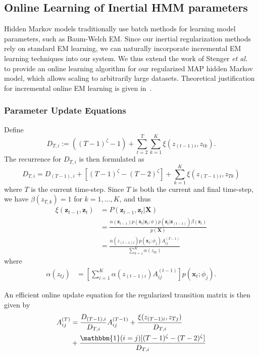 \documentclass[letterpaper]{article}
\begin{document}
\subsection{Online Learning of Inertial HMM parameters}

Hidden Markov models traditionally use batch methods for learning model
parameters, such as Baum-Welch EM. Since our inertial regularization methods
rely on standard EM learning, we can naturally incorporate incremental EM
learning techniques into our system. We thus extend the work of Stenger \emph{et
al.}~\cite{stenger2001} to provide an online learning algorithm for our
regularized MAP hidden Markov model, which allows scaling to arbitrarily large
datasets. Theoretical justification for incremental online EM learning is given
in~\cite{Neal:1999:VEA:308574.308679}.

\subsubsection{Parameter Update Equations}

Define 
\[
   D_{T,i} := ((T-1)^\zeta -1) + \sum_{t=2}^{T}\sum_{k=1}^{K} \xi(z_{(t-1)i}, z_{tk}).
\]
The recurrence for $D_{T,i}$ is then formulated as
\begin{equation*}
    D_{T,i} = D_{(T-1), i} + [(T-1)^\zeta - (T-2)^\zeta] + \sum_{k=1}^{K}
    \xi(z_{(T-1)i}, z_{Tk})
\end{equation*}
where $T$ is the current time-step. Since $T$ is both the current and final time-step, we have $\beta(z_{T,k}) = 1$ for $k = 1, \ldots, K$, and thus
\begin{align*}
    \xi(\mathbf{z}_{t-1}, \mathbf{z}_{t}) 
            &= P(\mathbf{z}_{t-1}, \mathbf{z}_{t} | \mathbf{X}) \\
            &= \frac{\alpha(\mathbf{z}_{t-1})p(\mathbf{x}_t|\mathbf{z}_t; \phi)p(\mathbf{z}_{t}|\mathbf{z}_{(t-1)})\beta(\mathbf{z}_t)}{p(\mathbf{X})} \\
            &= \frac{\alpha(z_{(t-1)i})p(\mathbf{x}_t; \phi_j)A_{ij}^{(T-1)}}{\sum_{k=1}^{K}\alpha(z_{tk})}
\end{align*}
where
\begin{align*}
    \alpha(z_{tj}) &= \left[\sum_{i=1}^{K} \alpha(z_{(t-1)i})A_{ij}^{(t-1)}\right]p(\mathbf{x}_t; \phi_j).
\end{align*}

An efficient online update equation for the regularized transition matrix is then given by
\begin{align*}
    A_{ij}^{(T)} &= \frac{D_{(T-1), i}}{D_{T,i}}A_{ij}^{(T-1)}
    + \frac{\xi(z_{(T-1)i}, z_{Tj})}{D_{T,i}} \\
                 &+ \frac{\mathbbm{1}(i = j)[(T-1)^\zeta - (T-2)^\zeta]}{D_{T,i}}
\end{align*}
\end{document}
